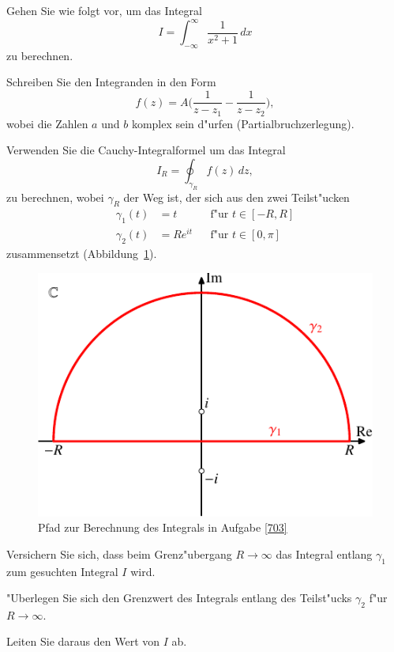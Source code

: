 Gehen Sie wie folgt vor, um das Integral
\[
I=\int_{-\infty}^{\infty} \frac1{x^2 + 1}\,dx
\]
zu berechnen.
\begin{teilaufgaben}
\item Schreiben Sie den Integranden in den Form
\begin{equation}
f(z)=A\biggl(\frac{1}{z-z_1} - \frac{1}{z-z_2}\biggr),
\label{703:fz}
\end{equation}
wobei die Zahlen $a$ und $b$ komplex sein d"urfen (Partialbruchzerlegung).
\item
Verwenden Sie die Cauchy-Integralformel um das Integral
\[
I_R
=
\oint_{\gamma_R}f(z)\,dz,
\]
zu berechnen,
wobei $\gamma_R$ der Weg ist, der sich aus den zwei Teilst"ucken
\[
\begin{aligned}
\gamma_1(t)&=t&&\text{f"ur $t\in[-R,R]$}\\
\gamma_2(t)&=Re^{it}&&\text{f"ur $t\in[0,\pi]$}
\end{aligned}
\]
zusammensetzt (Abbildung~\ref{703:path}).
\begin{figure}
\centering
\includegraphics{../skript/uebungsaufgaben/path-1.pdf}
\caption{Pfad zur Berechnung des Integrals in Aufgabe \ref{703}
\label{703:path}}
\end{figure}
\item 
Versichern Sie sich, dass beim Grenz"ubergang $R\to\infty$ das Integral
entlang $\gamma_1$ zum gesuchten Integral $I$ wird.
\item
"Uberlegen Sie sich den Grenzwert des Integrals entlang des Teilst"ucks
$\gamma_2$ f"ur $R\to\infty$.
\item
Leiten Sie daraus den Wert von $I$ ab.
\end{teilaufgaben}

